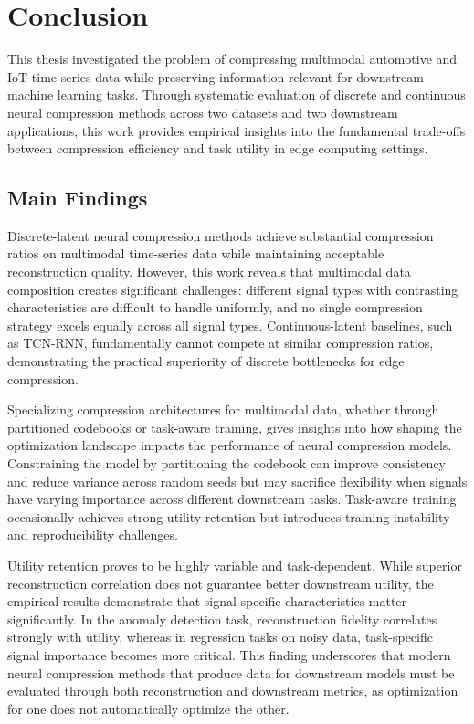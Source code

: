 \chapter{Conclusion}

This thesis investigated the problem of compressing multimodal automotive and IoT time-series data while preserving information relevant for downstream machine learning tasks. Through systematic evaluation of discrete and continuous neural compression methods across two datasets and two downstream applications, this work provides empirical insights into the fundamental trade-offs between compression efficiency and task utility in edge computing settings.

\section{Main Findings}

Discrete-latent neural compression methods achieve substantial compression ratios on multimodal time-series data while maintaining acceptable reconstruction quality. However, this work reveals that multimodal data composition creates significant challenges: different signal types with contrasting characteristics are difficult to handle uniformly, and no single compression strategy excels equally across all signal types. Continuous-latent baselines, such as TCN-RNN, fundamentally cannot compete at similar compression ratios, demonstrating the practical superiority of discrete bottlenecks for edge compression.

Specializing compression architectures for multimodal data, whether through partitioned codebooks or task-aware training, gives insights into how shaping the optimization landscape impacts the performance of neural compression models. Constraining the model by partitioning the codebook can improve consistency and reduce variance across random seeds but may sacrifice flexibility when signals have varying importance across different downstream tasks. Task-aware training occasionally achieves strong utility retention but introduces training instability and reproducibility challenges. 

Utility retention proves to be highly variable and task-dependent. While superior reconstruction correlation does not guarantee better downstream utility, the empirical results demonstrate that signal-specific characteristics matter significantly. In the anomaly detection task, reconstruction fidelity correlates strongly with utility, whereas in regression tasks on noisy data, task-specific signal importance becomes more critical. This finding underscores that modern neural compression methods that produce data for downstream models must be evaluated through both reconstruction and downstream metrics, as optimization for one does not automatically optimize the other.


